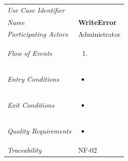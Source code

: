 \documentclass[12pt,letterpaper]{article}
\begin{document}
\begin{center}
	\begin{tabu} to 
		\toprule
		Use Case Identifier & \writeerror{} \\
		Name & {\bf WriteError} \\
		Participating Actors & Administrator \\
		Flow of Events & 
	    \begin{enumerate}[topsep=-1em,leftmargin=*]
		    \item 
		\end{enumerate} \\

		Entry Conditions &
		\begin{itemize}[topsep=-1em,leftmargin=*]
		    \item 
        \end{itemize} \\

		Exit Conditions &
		\begin{itemize}[topsep=-1em,leftmargin=*]
		    \item 
        \end{itemize} \\

		Quality Requirements &
		\begin{itemize}[topsep=-1em,leftmargin=*]
		    \item 
        \end{itemize} \\

		Traceability & NF-02 \\
		\toprule
	\end{tabu}
\end{center}
\end{document}
